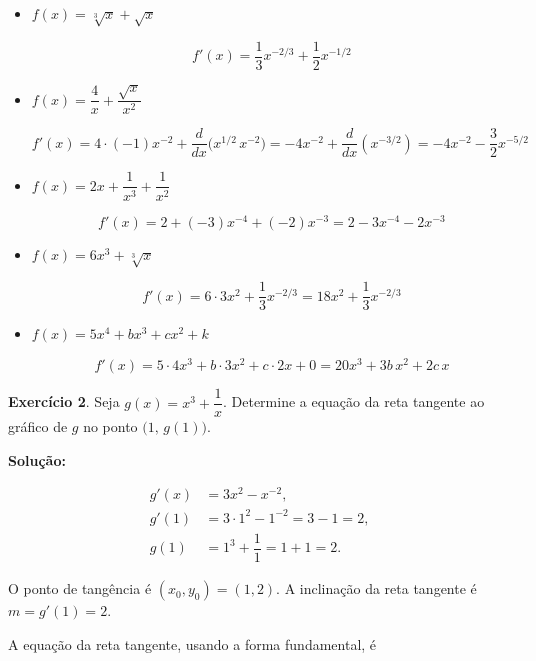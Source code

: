 \documentclass[12pt,openright,twoside,a4paper]{article}
\theoremstyle{definition}
\begin{document}
\begin{itemize}
		
		\[
		f'(x)
		= \dfrac{2}{3}\cdot3x^2 + \dfrac{1}{4}\cdot2x
		= 2x^2 + \tfrac12 x
		\]
		
		
		
		\item[j)] \(f(x) = \sqrt[3]{x} + \sqrt{x}\)  
		
		
		\[
		f'(x)
		= \dfrac{1}{3}x^{-2/3} + \dfrac12 x^{-1/2}
		\]
		
		
		
		\item[k)] \(f(x) = \dfrac{4}{x} + \dfrac{\sqrt{x}}{x^2}\)  
		
		
		\[
		f'(x)
		= 4\cdot(-1)x^{-2} + \dfrac{d}{dx}\bigl(x^{1/2}\,x^{-2}\bigr)
		= -4x^{-2} + \dfrac{d}{dx}(x^{-3/2})
		= -4x^{-2} - \dfrac32 x^{-5/2}
		\]
		
		
		
		\item[l)] \(f(x) = 2x + \dfrac{1}{x^3} + \dfrac{1}{x^2}\)  
		
		
		\[
		f'(x)
		= 2 + (-3)x^{-4} + (-2)x^{-3}
		= 2 - 3x^{-4} - 2x^{-3}
		\]
		
		
		
		\item[m)] \(f(x) = 6x^3 + \sqrt[3]{x}\)  
		
		
		\[
		f'(x)
		= 6\cdot3x^2 + \dfrac{1}{3}x^{-2/3}
		= 18x^2 + \dfrac{1}{3}x^{-2/3}
		\]
		
		
		
		\item[n)] \(f(x) = 5x^4 + bx^3 + cx^2 + k\)  
		
		
		\[
		f'(x)
		= 5\cdot4x^3 + b\cdot3x^2 + c\cdot2x + 0
		= 20x^3 + 3b\,x^2 + 2c\,x
		\]
		
		
	\end{itemize}
	
	\textbf{Exercício 2}. Seja $g(x) = x^3 + \dfrac{1}{x}$. Determine a equação da reta tangente ao gráfico de \(g\) no ponto \(\bigl(1,\,g(1)\bigr)\).
	
	
	\textbf{Solução:}
	
	\begin{align*}
		g'(x) &= 3x^2 - x^{-2}, \\
		g'(1) &= 3\cdot1^2 - 1^{-2} = 3 - 1 = 2, \\
		g(1) &= 1^3 + \dfrac{1}{1} = 1 + 1 = 2.
	\end{align*}
	
	O ponto de tangência é \((x_0,y_0) = (1,2)\).  
	A inclinação da reta tangente é \(m = g'(1) = 2\).  
	
	A equação da reta tangente, usando a forma fundamental, é
	
\end{document}
